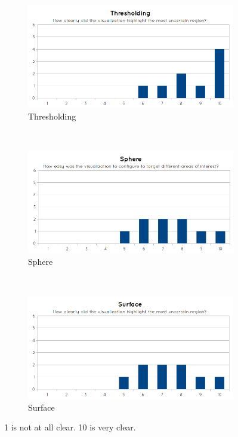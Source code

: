 \begin{figure}[H]
  \centering
  \begin{subfigure}[b]{0.5\textwidth}
    \includegraphics[width=\textwidth]{images/evaluation/graph_thresholding_2.png}
    \caption*{Thresholding}
    \label{fig:eval_visualization_q2_thresholding}
  \end{subfigure}%
  ~ %
  \begin{subfigure}[b]{0.5\textwidth}
    \includegraphics[width=\textwidth]{images/evaluation/graph_sphere_2.png}
    \caption*{Sphere}
    \label{fig:eval_visualization_q2_sphere}
  \end{subfigure}
  ~ %
  \begin{subfigure}[b]{0.5\textwidth}
    \includegraphics[width=\textwidth]{images/evaluation/graph_surface_2.png}
    \caption*{Surface}
    \label{fig:eval_visualization_q2_surface}  
  \end{subfigure}
  \caption{1 is not at all clear. 10 is very clear.}\label{fig:eval_visualization_q2}
\end{figure}

